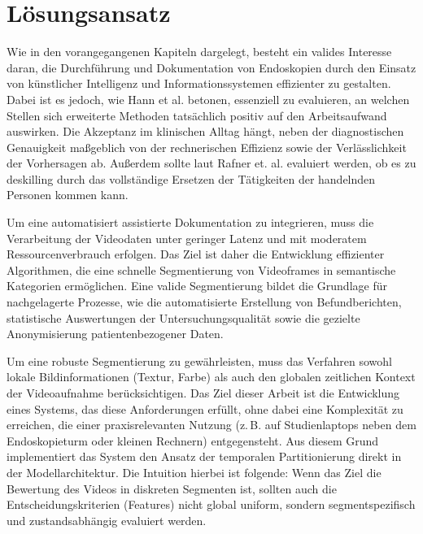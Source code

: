 \chapter{Lösungsansatz}\label{ch:approach}

Wie in den vorangegangenen Kapiteln dargelegt, besteht ein valides Interesse daran, die Durchführung und Dokumentation von Endoskopien durch den Einsatz von künstlicher Intelligenz und Informationssystemen effizienter zu gestalten. Dabei ist es jedoch, wie Hann et al. \cite{hann_entscheidungsunterstutzung_2025} betonen, essenziell zu evaluieren, an welchen Stellen sich erweiterte Methoden tatsächlich positiv auf den Arbeitsaufwand auswirken. Die Akzeptanz im klinischen Alltag hängt, neben der diagnostischen Genauigkeit maßgeblich von der rechnerischen Effizienz sowie der Verlässlichkeit der Vorhersagen ab. \cite{Ali2020} Außerdem sollte laut Rafner et. al. evaluiert werden, ob es zu deskilling durch das vollständige Ersetzen der Tätigkeiten der handelnden Personen kommen kann. \cite{rafner_2025_deskilling}

Um eine automatisiert assistierte Dokumentation zu integrieren, muss die Verarbeitung der Videodaten unter geringer Latenz und mit moderatem Ressourcenverbrauch erfolgen. Das Ziel ist daher die Entwicklung effizienter Algorithmen, die eine schnelle Segmentierung von Videoframes in semantische Kategorien ermöglichen. Eine valide Segmentierung bildet die Grundlage für nachgelagerte Prozesse, wie die automatisierte Erstellung von Befundberichten, statistische Auswertungen der Untersuchungsqualität sowie die gezielte Anonymisierung patientenbezogener Daten.

Um eine robuste Segmentierung zu gewährleisten, muss das Verfahren sowohl lokale Bildinformationen (Textur, Farbe) als auch den globalen zeitlichen Kontext der Videoaufnahme berücksichtigen. Das Ziel dieser Arbeit ist die Entwicklung eines Systems, das diese Anforderungen erfüllt, ohne dabei eine Komplexität zu erreichen, die einer praxisrelevanten Nutzung (z.\,B. auf Studienlaptops neben dem Endoskopieturm oder kleinen Rechnern) entgegensteht.
Aus diesem Grund implementiert das System den Ansatz der temporalen Partitionierung direkt in der Modellarchitektur. Die Intuition hierbei ist folgende: Wenn das Ziel die Bewertung des Videos in diskreten Segmenten ist, sollten auch die Entscheidungskriterien (Features) nicht global uniform, sondern segmentspezifisch und zustandsabhängig evaluiert werden.

